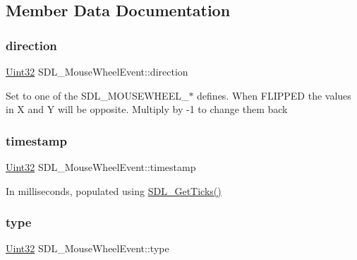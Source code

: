 \subsection{Member Data Documentation}
\mbox{\label{struct_s_d_l___mouse_wheel_event_a9fc46552d116499e5b8ca89d66df932c}} 
\subsubsection{\texorpdfstring{direction}{direction}}
{\footnotesize\ttfamily \mbox{\hyperlink{_s_d_l__stdinc_8h_add440eff171ea5f55cb00c4a9ab8672d}{Uint32}} S\+D\+L\+\_\+\+Mouse\+Wheel\+Event\+::direction}

Set to one of the S\+D\+L\+\_\+\+M\+O\+U\+S\+E\+W\+H\+E\+E\+L\+\_\+$\ast$ defines. When F\+L\+I\+P\+P\+ED the values in X and Y will be opposite. Multiply by -\/1 to change them back \mbox{\label{struct_s_d_l___mouse_wheel_event_a83ad52c80ff49a8e75dc6c33bba65fa0}} 
\subsubsection{\texorpdfstring{timestamp}{timestamp}}
{\footnotesize\ttfamily \mbox{\hyperlink{_s_d_l__stdinc_8h_add440eff171ea5f55cb00c4a9ab8672d}{Uint32}} S\+D\+L\+\_\+\+Mouse\+Wheel\+Event\+::timestamp}

In milliseconds, populated using \mbox{\hyperlink{_s_d_l__timer_8h_a0b9bc71d6287e0ffafdc3419760fe2b3}{S\+D\+L\+\_\+\+Get\+Ticks()}} \mbox{\label{struct_s_d_l___mouse_wheel_event_aa6b741e99df708c6f9550ee0f520fb70}} 
\subsubsection{\texorpdfstring{type}{type}}
{\footnotesize\ttfamily \mbox{\hyperlink{_s_d_l__stdinc_8h_add440eff171ea5f55cb00c4a9ab8672d}{Uint32}} S\+D\+L\+\_\+\+Mouse\+Wheel\+Event\+::type}

